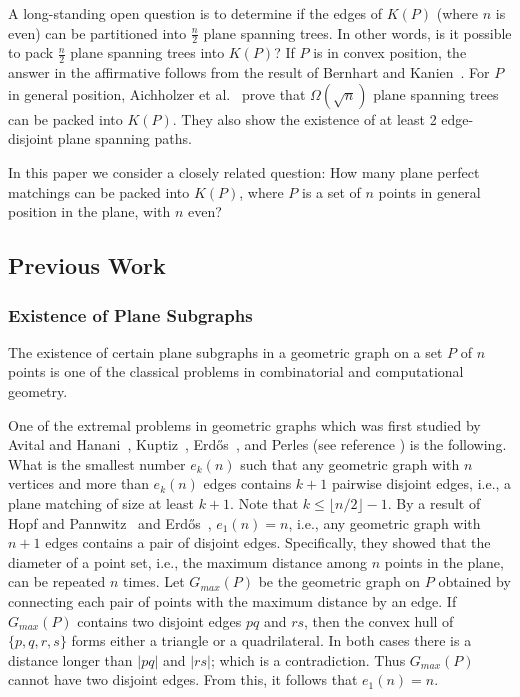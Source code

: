 \documentclass[11pt,a4paper]{article}
\newcommand{\Kn}[1]{K#1}
\newcommand{\e}[2]{e_{#1}{(#2)}}
\begin{document}
A long-standing open question is to determine if the edges of $\Kn{(P)}$ (where $n$ is even) can be partitioned into $\frac{n}{2}$ plane spanning trees. In other words, is it possible to pack $\frac{n}{2}$ plane spanning trees into $\Kn{(P)}$? If $P$ is in convex position, the answer in the affirmative follows from the result of Bernhart and Kanien~\cite{Bernhart1979}. For $P$ in general position, Aichholzer et al.~\cite{Aichholzer2014} prove that $\Omega(\sqrt{n})$ plane spanning trees can be packed into $\Kn{(P)}$. They also show the existence of at least 2 edge-disjoint plane spanning paths. 

In this paper we consider a closely related question: How many plane perfect matchings can be packed into $\Kn{(P)}$, where $P$ is a set of $n$ points in general position in the plane, with $n$ even? 
\subsection{Previous Work}
\label{previous-work-section}
\subsubsection{Existence of Plane Subgraphs}
The existence of certain plane subgraphs in a geometric graph on a set $P$ of $n$ points is one of the classical problems in combinatorial and computational geometry. 

One of the extremal problems in geometric graphs which was first studied by Avital and Hanani~\cite{Avital1966}, Kuptiz~\cite{Kupitz1979}, Erd\H{o}s~\cite{Erdos1946}, and Perles (see reference \cite{Toth1999}) is the following. What is the smallest number $\e{k}{n}$ such that any geometric graph with $n$ vertices and more than $\e{k}{n}$ edges contains $k+1$ pairwise disjoint edges, i.e., a plane matching of size at least $k+1$. Note that $k\le\lfloor n/2\rfloor-1$. By a result of Hopf and Pannwitz~\cite{Hopf1934} and Erd\H{o}s~\cite{Erdos1946}, $\e{1}{n}=n$, i.e., any geometric graph with $n+1$ edges contains a pair of disjoint edges. Specifically, they showed that the diameter of a point set, i.e., the maximum distance among $n$ points in the plane, can be repeated $n$ times. Let $G_{max}(P)$ be the geometric graph on $P$ obtained by connecting each pair of points with the maximum distance by an edge. If $G_{max}(P)$ contains two disjoint edges $pq$ and $rs$, then the convex hull of $\{p,q,r,s\}$ forms either a triangle or a quadrilateral. In both cases there is a distance longer than $|pq|$ and $|rs|$; which is a contradiction. Thus $G_{max}(P)$ cannot have two disjoint edges. From this, it follows that $\e{1}{n}=n$.
\end{document}
